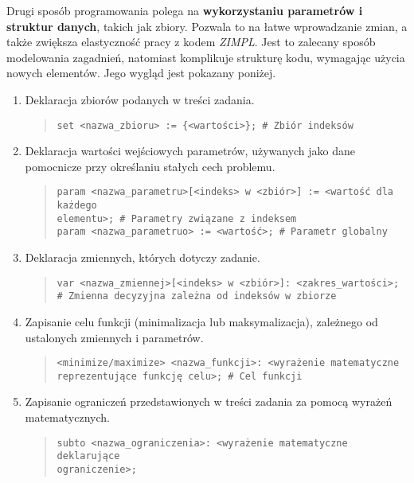 Drugi sposób programowania polega na \textbf{wykorzystaniu parametrów i struktur danych}, takich jak zbiory. Pozwala to na łatwe wprowadzanie zmian, a także zwiększa elastyczność pracy z kodem  \textit{ZIMPL}. Jest to zalecany sposób modelowania zagadnień, natomiast komplikuje strukturę kodu, wymagając użycia nowych elementów. %
Jego wygląd jest pokazany poniżej.

\begin{enumerate}
\item Deklaracja zbiorów podanych w treści zadania.

\begin{quote}
\begin{verbatim}
set <nazwa_zbioru> := {<wartości>}; # Zbiór indeksów
\end{verbatim}
\end{quote}

\item Deklaracja wartości wejściowych parametrów, używanych jako dane pomocnicze przy określaniu stałych cech problemu.

\begin{quote}
\begin{verbatim}
param <nazwa_parametru>[<indeks> w <zbiór>] := <wartość dla każdego
elementu>; # Parametry związane z indeksem
param <nazwa_parametruo> := <wartość>; # Parametr globalny
\end{verbatim}
\end{quote}

\item Deklaracja zmiennych, których dotyczy zadanie.

\begin{quote}
\begin{verbatim}
var <nazwa_zmiennej>[<indeks> w <zbiór>]: <zakres_wartości>;
# Zmienna decyzyjna zależna od indeksów w zbiorze
\end{verbatim}
\end{quote}

\item Zapisanie celu funkcji (minimalizacja lub maksymalizacja), zależnego od ustalonych zmiennych i parametrów.

\begin{quote}
\begin{verbatim}
<minimize/maximize> <nazwa_funkcji>: <wyrażenie matematyczne
reprezentujące funkcję celu>; # Cel funkcji
\end{verbatim}
\end{quote}

\item Zapisanie ograniczeń przedstawionych w treści zadania za pomocą wyrażeń matematycznych.

\begin{quote}
\begin{verbatim}
subto <nazwa_ograniczenia>: <wyrażenie matematyczne deklarujące
ograniczenie>;
\end{verbatim}
\end{quote}
\end{enumerate}

